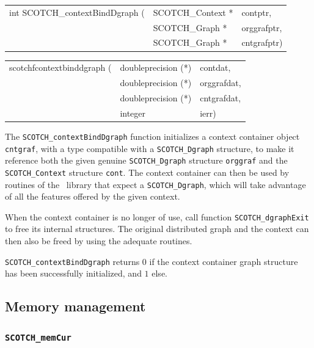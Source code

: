 \begin{itemize}
\progsyn

{\tt\begin{tabular}{l@{}ll}
int SCOTCH\_contextBindDgraph ( & SCOTCH\_Context * & contptr,    \\
                                & SCOTCH\_Graph *   & orggrafptr, \\
                                & SCOTCH\_Graph *   & cntgrafptr)
\end{tabular}}

{\tt\begin{tabular}{l@{}ll}
scotchfcontextbinddgraph ( & doubleprecision (*) & contdat,    \\
                           & doubleprecision (*) & orggrafdat, \\
                           & doubleprecision (*) & cntgrafdat, \\
                           & integer             & ierr)
\end{tabular}}

\progdes

The \texttt{SCOTCH\_contextBindDgraph} function initializes a context
container object \texttt{cnt\lbt graf}, with a type compatible with a
\texttt{SCOTCH\_\lbt Dgraph} structure, to make it reference both the
given genuine \texttt{SCOTCH\_\lbt Dgraph} structure
\texttt{org\lbt graf} and the \texttt{SCOTCH\_\lbt Context} structure
\texttt{cont}. The context container can then be used by routines of
the \libptscotch\ library that expect a \texttt{SCOTCH\_\lbt Dgraph},
which will take advantage of all the features offered by the given
context.

When the context container is no longer of use, call function
\texttt{SCOTCH\_\lbt dgraph\lbt Exit} to free its internal
structures. The original distributed graph and the context can then
also be freed by using the adequate routines.

\progret

\texttt{SCOTCH\_contextBindDgraph} returns $0$ if the context container
graph structure has been successfully initialized, and $1$ else.
\end{itemize}

\subsection{Memory management}
\label{sec-lib-func-mem}

\subsubsection{{\tt SCOTCH\_memCur}}

